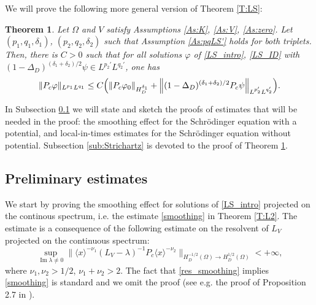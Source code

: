 \documentclass[10pt,leqno]{amsart}
\DeclareMathOperator{\im}{Im} %
\newtheorem{theorem}{Theorem}[section]
\theoremstyle{definition}%
\theoremstyle{remark}
\numberwithin{equation}{section}
\renewcommand{\^}{\widehat}%
\begin{document}
We will prove the following more general version of Theorem \ref{T:LS}:
\begin{theorem}
 	Let $\Omega$ and $V$ satisfy Assumptions \ref{As:K}, \ref{As:V}, \ref{As:zero}. Let $(p_1,q_1,\delta_1)$, $(p_2,q_2,\delta_2)$ such that Assumption \ref{As:pqLS'} holds for both triplets. Then, there is $C>0$ such that for all solutions $\varphi$ of \eqref{LS_intro}, \eqref{LS_ID} with $(1-\Delta_D)^{(\delta_1+\delta_2)/2}\psi\in  L^{p_2'}L^{q_2'}$, one has
 \label{T:LS'}
	\begin{equation}
	\label{eq:strichartzLS'}
	\|P_c \varphi\|_{L^{p_1}L^{q_1}}\le C\Bigl(\|P_c\varphi_0\|_{H_D^{\delta_1}}+\left\|(1-\Delta_D)^{(\delta_1+\delta_2)/2}P_c \psi\right\|_{L^{p_2'}L^{q_2'}}\Bigr).
	\end{equation}
\end{theorem}
In Subsection \ref{sub:prelim} we will state and sketch the proofs of estimates that will be needed in the proof: the smoothing effect for the Schr\"odinger equation with a potential, and local-in-times estimates for the Schr\"odinger equation without potential. Subsection \ref{sub:Strichartz} is devoted to the proof of Theorem \ref{T:LS'}.
 
\subsection{Preliminary estimates}
\label{sub:prelim}
We start by proving the smoothing effect for solutions of \eqref{LS_intro} projected on the continous spectrum, i.e. the estimate \eqref{smoothing} in Theorem \ref{T:L2}. The estimate is a consequence of the following estimate on the resolvent of $L_V$ projected on the continuous spectrum:
\begin{equation}
	\label{res_smoothing}
\sup_{\im \lambda\neq 0}
	\|\langle x\rangle^{-\nu_1}
	(L_V-\lambda)^{-1}P_c\langle x\rangle^{-\nu_2}\|_{H_D^{-1/2}(\Omega)\to H^{1/2}_D(\Omega)}<+\infty, 
\end{equation} 
where $\nu_1,\nu_2>1/2$, $\nu_1+\nu_2>2$.
The fact that \eqref{res_smoothing} implies \eqref{smoothing} is standard and we omit the proof (see e.g. the proof of Proposition 2.7 in \cite{BuGeTz04a}).
\end{document}
